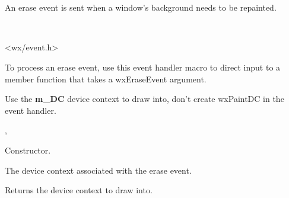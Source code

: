 \section{}\label{wxeraseevent}

An erase event is sent when a window's background needs to be repainted.


\\


<wx/event.h>


To process an erase event, use this event handler macro to direct input to a member
function that takes a wxEraseEvent argument.

\twocolwidtha{7cm}
\begin{twocollist}\itemsep=0pt
\end{twocollist}%


Use the {\bf m\_DC} device context to draw into, don't create wxPaintDC in 
the event handler.


, 




Constructor.



The device context associated with the erase event.

\label{wxeraseeventgetdc}


Returns the device context to draw into.

